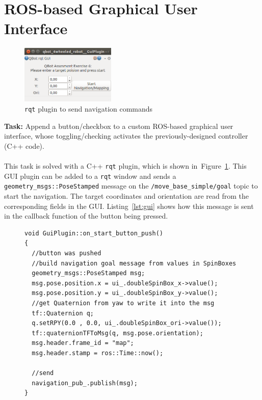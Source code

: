 \documentclass[a4paper,11pt]{article}
\newcommand{\reffig}[1]{Figure~\ref{#1}}
\newcommand{\reflst}[1]{Listing~\ref{#1}}
\begin{document}
\section{ROS-based Graphical User Interface}
\label{sec:e6}
\begin{figure}
  \centering
  \vspace{-0.4cm}
  \includegraphics[width=0.4\textwidth]{qbot-gui}
  \caption{\texttt{rqt} plugin to send navigation commands}
  \label{fig:rqt}
  \vspace{-0.4cm}
\end{figure}
\textbf{Task:} Append a button/checkbox to a custom ROS-based
graphical user interface, whose toggling/checking activates the
previously-designed controller (C++ code).\\
\vspace{0.2cm}\\
This task is solved with a C++ \texttt{rqt} plugin, which is shown
in~\reffig{fig:rqt}.
This GUI plugin can be added to a \texttt{rqt} window and sends a
\texttt{geometry\_msgs::PoseStamped} message on the
\texttt{/move\_base\_simple/goal} topic to start the navigation. The
target coordinates and orientation are read from the corresponding
fields in the GUI. \reflst{lst:gui} shows how this message is sent in
the callback function of the button being pressed.
\begin{figure}
\begin{lstlisting}[showlines,style=SmallCpp, caption={\texttt{rqt}
        function starting the navigation},
    label=lst:gui]
void GuiPlugin::on_start_button_push()
{
  //button was pushed
  //build navigation goal message from values in SpinBoxes
  geometry_msgs::PoseStamped msg;
  msg.pose.position.x = ui_.doubleSpinBox_x->value();
  msg.pose.position.y = ui_.doubleSpinBox_y->value();
  //get Quaternion from yaw to write it into the msg
  tf::Quaternion q;
  q.setRPY(0.0 , 0.0, ui_.doubleSpinBox_ori->value());
  tf::quaternionTFToMsg(q, msg.pose.orientation);
  msg.header.frame_id = "map";
  msg.header.stamp = ros::Time::now();

  //send
  navigation_pub_.publish(msg);
}
\end{lstlisting}
\end{figure}




\end{document}
